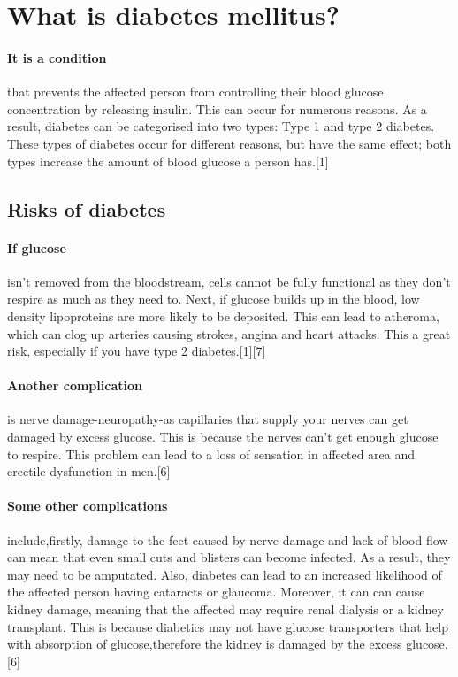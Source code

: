 \section{What is diabetes mellitus?}
\paragraph{It is a condition}that prevents the affected person from controlling their blood glucose concentration by releasing insulin. This can occur for numerous reasons. As a result, diabetes can be categorised into two types: Type 1  and type 2 diabetes. These types of diabetes occur for different reasons, but have the same effect; both types increase the amount of blood glucose a person has.[1]
\subsection{Risks of diabetes}
\paragraph{If glucose}isn't removed from the bloodstream, cells cannot be fully functional as they don't respire as much as they need to. Next, if glucose builds up in the blood, low density lipoproteins are more likely to be deposited. This can lead to atheroma, which can clog up arteries causing strokes, angina and heart attacks. This a great risk, especially if you have type 2 diabetes.[1][7]
\paragraph{Another complication}is nerve damage-neuropathy-as capillaries that supply your nerves can get damaged by excess glucose. This is because the nerves can't get enough glucose to respire. This problem can lead to a loss of sensation in affected area and erectile dysfunction in men.[6]
\paragraph{Some other complications}include,firstly, damage to the feet caused by nerve damage and lack of blood flow can mean that even small cuts and blisters can become infected. As a result, they may need to be amputated. Also, diabetes can lead to an increased likelihood of the affected person having cataracts or glaucoma. Moreover, it can can cause kidney damage, meaning that the affected may require renal dialysis or a kidney transplant. This is because diabetics may not have glucose transporters that help with absorption of glucose,therefore the kidney is damaged by the excess glucose.[6]
